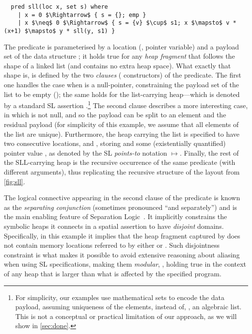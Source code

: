 \begin{lstlisting}
  pred sll(loc x, set s) where
    | x = 0 $\Rightarrow$ { s = {}; emp }
    | x $\neq$ 0 $\Rightarrow$ { s = {v} $\cup$ s1; x $\mapsto$ v * (x+1) $\mapsto$ y * sll(y, s1) }
\end{lstlisting}

\noindent
%
The predicate  is parameterised by a location (\ie, pointer variable)
 and a payload set of the data structure
;
%
%
it holds true for any
\emph{heap fragment} that follows the shape of a linked list (and
contains no extra heap space).
%
What exactly that shape is, is defined by the two \emph{clauses} (\aka
constructors) of the predicate. 
%
The first one handles the case when  is a null-pointer,
constraining the payload set  of the list to be empty
(\code{\{\}}); the same holds for the list-carrying heap---which is
denoted by a standard SL assertion .\footnote{For
  simplicity, our examples use mathematical sets to encode the data
  payload, assuming uniqueness of the elements, instead of, \eg, an
  algebraic list. This is not a conceptual or practical limitation of
  our approach, as we will show in \autoref{sec:done}.}
%
The second clause describes a more interesting case, in which 
is not null, and so the payload can be split to an element 
and the residual payload  (for simplicity of this example, we
assume that all elements of the list are unique).
%
Furthermore, the heap carrying the list is specified to have two
consecutive locations,  and , storing 
and some (existentially quantified) pointer value , as denoted
by the SL \emph{points-to} notation $\mapsto$.
%
Finally, the rest of the SLL-carrying heap is 
the recursive occurrence of the same predicate  (with
different arguments), thus replicating the recursive structure of the
layout from \autoref{fig:sll}.
%



The logical connective \code{*} appearing in the second clause of the
 predicate is known as the \emph{separating conjunction}
(sometimes pronounced ``and separately'') and is the main enabling
feature of Separation Logic~\cite{OHearn-al:CSL01}.
%
It implicitly constrains the symbolic heaps it connects in a spatial
assertion to have \emph{disjoint} domains.
%
Specifically, in this example it implies that the heap fragment
captured by  does not contain memory locations
referred to by either  or .
%
Such disjointness constraint  is what makes it
possible to avoid extensive reasoning about aliasing when using SL
specifications, making them \emph{modular}, \ie, holding true in the
context of any heap that is larger than what is affected by the
specified program.
%


